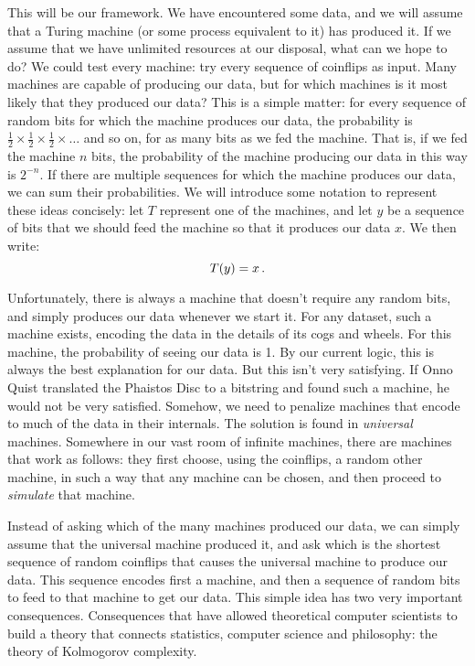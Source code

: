 This will be our framework. We have encountered some data, and we will assume that a Turing machine (or some process equivalent to it) has produced it. If we assume that we have unlimited resources at our disposal, what can we hope to do? We could test every machine: try every sequence of coinflips as input. Many machines are capable of producing our data, but for which machines is it most likely that they produced our data? This is a simple matter: for every sequence of random bits for which the machine produces our data, the probability is $\frac{1}{2} \times \frac{1}{2} \times \frac{1}{2}\times \ldots$ and so on, for as many bits as we fed the machine. That is, if we fed the machine $n$ bits, the probability of the machine producing our data in this way is $2^{-n}$. If there are multiple sequences for which the machine produces our data, we can sum their probabilities. We will introduce some notation to represent these ideas concisely: let $T$ represent one of the machines, and let $y$ be a sequence of bits that we should feed the machine so that it produces our data $x$. We then write:
\[
T(y) = x \,\text{.}
\]

Unfortunately, there is always a machine that doesn't require any random bits, and simply produces our data whenever we start it. For any dataset, such a machine exists, encoding the data in the details of its cogs and wheels. For this machine, the probability of seeing our data is 1. By our current logic, this is always the best explanation for our data. But this isn't very satisfying. If Onno Quist translated the Phaistos Disc to a bitstring and found such a machine, he would not be very satisfied. Somehow, we need to penalize machines that encode to much of the data in their internals. The solution is found in \emph{universal} machines. Somewhere in our vast room of infinite machines, there are machines that work as follows: they first choose, using the coinflips, a random other machine, in such a way that any machine can be chosen, and then proceed to \emph{simulate} that machine.

Instead of asking which of the many machines produced our data, we can simply assume that the universal machine produced it, and ask which is the shortest sequence of random coinflips that causes the universal machine to produce our data. This sequence encodes first a machine, and then a sequence of random bits to feed to that machine to get our data. This simple idea has two very important consequences. Consequences that have allowed theoretical computer scientists to build a theory that connects statistics, computer science and philosophy: the theory of Kolmogorov complexity.

